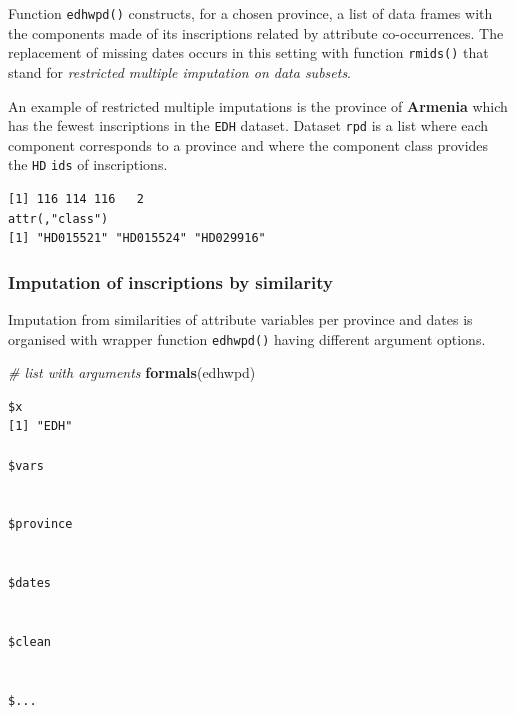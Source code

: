 \documentclass[a4paper,11pt]{memoir}
\newenvironment{Shaded}{\begin{snugshade}}{\end{snugshade}}
\newcommand{\CommentTok}[1]{\textcolor[rgb]{0.56,0.35,0.01}{\textit{#1}}}
\newcommand{\KeywordTok}[1]{\textcolor[rgb]{0.13,0.29,0.53}{\textbf{#1}}}
\newcommand{\NormalTok}[1]{#1}
\newcommand{\OperatorTok}[1]{\textcolor[rgb]{0.81,0.36,0.00}{\textbf{#1}}}
\begin{document}
Function \texttt{edhwpd()} constructs, for a chosen province, a list of
data frames with the components made of its inscriptions related by
attribute co-occurrences. The replacement of missing dates occurs in
this setting with function \texttt{rmids()} that stand for
\emph{restricted multiple imputation on data subsets}.

An example of restricted multiple imputations is the province of
\textbf{Armenia} which has the fewest inscriptions in the \texttt{EDH}
dataset. Dataset \texttt{rpd} is a list where each component corresponds
to a province and where the component class provides the \texttt{HD}
\texttt{ids} of inscriptions.

\begin{Shaded}
\end{Shaded}

\begin{verbatim}
[1] 116 114 116   2
attr(,"class")
[1] "HD015521" "HD015524" "HD029916"
\end{verbatim}

\hypertarget{imputation-of-inscriptions-by-similarity}{%
\subsubsection{Imputation of inscriptions by
similarity}\label{imputation-of-inscriptions-by-similarity}}

Imputation from similarities of attribute variables per province and
dates is organised with wrapper function \texttt{edhwpd()} having
different argument options.

\begin{Shaded}
\begin{Highlighting}[]
\CommentTok{# list with arguments}
\KeywordTok{formals}\NormalTok{(edhwpd)}
\end{Highlighting}
\end{Shaded}

\begin{verbatim}
$x
[1] "EDH"

$vars


$province


$dates


$clean


$...
\end{verbatim}
\end{document}
